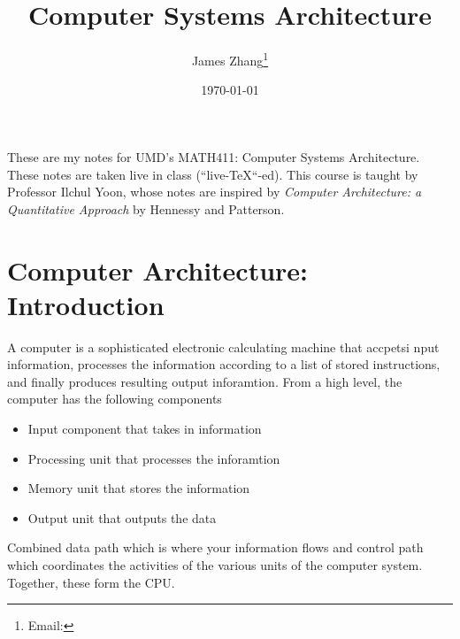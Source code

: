 \documentclass[12pt]{scrartcl}
\begin{document}
\title{Computer Systems Architecture}
\author{James Zhang\thanks{Email: }}
\date{\today}




\maketitle
These are my notes for UMD's MATH411: Computer Systems Architecture. These notes are taken live in class 
(``live-\TeX``-ed). This course is taught by Professor Ilchul Yoon, whose notes are inspired by \textit{Computer Architecture:
 a Quantitative Approach} by Hennessy and Patterson.
\tableofcontents

\newpage

\section{Computer Architecture: Introduction}

\begin{definition}[Computer]
  A computer is a sophisticated electronic calculating machine 
  that accpetsi nput information, processes the information
  according to a list of stored instructions, and finally produces 
  resulting output inforamtion. From a high level, the computer 
  has the following components
  \begin{itemize}
    \item Input component that takes in information
    \item Processing unit that processes the inforamtion
    \item Memory unit that stores the information
    \item Output unit that outputs the data
  \end{itemize}
\end{definition}

\begin{definition}
  Combined data path which is where your information flows and control path which coordinates the activities of the various units of the 
  computer system. Together, these form the CPU.
\end{definition}
\end{document}
